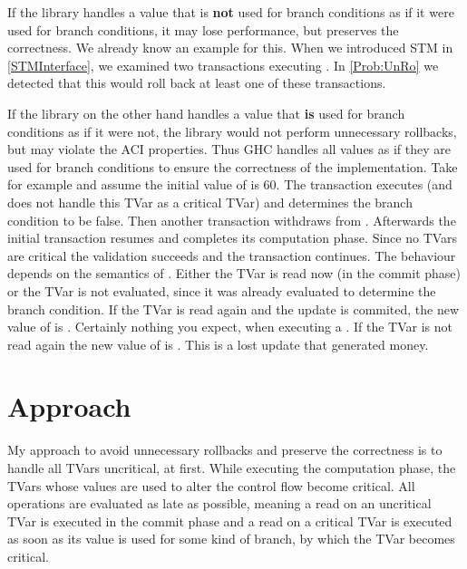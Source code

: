 If the library handles a value that is \textbf{not} used for branch conditions as if it were used for branch conditions, 
it may lose performance, but preserves the correctness. We already know an example for this. When we introduced
STM in \ref{STMInterface}, we examined two transactions executing . In \ref{Prob:UnRo} we detected
that this would roll back at least one of these transactions. 


If the library on the other hand handles a value that \textbf{is}
used for branch conditions as if it were not, the library would not perform unnecessary rollbacks, but may violate 
the ACI properties. Thus GHC handles all values as if they are used for branch conditions to ensure the correctness 
of the implementation. Take for example  and assume the initial value of  is 60. 
The transaction executes  (and does not handle this TVar as a critical TVar) and determines the 
branch condition to be false. Then another transaction withdraws  from . Afterwards the initial  
transaction resumes and completes its computation phase. Since no TVars are critical the validation succeeds and
the transaction continues. The behaviour depends on the semantics of . Either the TVar is read now
(in the commit phase) or the TVar is not evaluated, since it was already evaluated to determine the branch condition.
If the TVar is read again and the update is commited, the new value of  is . Certainly nothing
you expect, when executing a . If the TVar is not read again the new value of  is
. This is a lost update that generated money. 

\section{Approach}
My approach to avoid unnecessary rollbacks and preserve the correctness is to handle all TVars uncritical, at first. 
While executing the computation 
phase, the TVars whose values are used to alter the control flow become critical. All  operations are
evaluated as late as possible, meaning a read on an uncritical TVar is executed in the commit phase and a read on 
a critical TVar is executed as soon as its value is used for some kind of branch, by which the TVar becomes critical.


